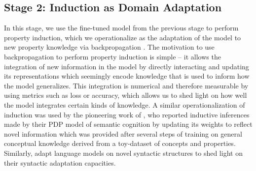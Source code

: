 \documentclass[10pt,letterpaper]{article}
\begin{document}
\subsection{Stage 2: Induction as Domain Adaptation}
In this stage, we use the fine-tuned model from the previous stage to perform property induction, which we operationalize as the adaptation of the model to new property knowledge via backpropagation \citep{rumelhart1986learning}.
The motivation to use backpropagation to perform property induction is simple -- it allows the integration of new information in the model by directly interacting and updating its representations which seemingly encode knowledge that is used to inform how the model generalizes. 
This integration is numerical and therefore measurable by using metrics such as loss or accuracy, which allows us to shed light on how well the model integrates certain kinds of knowledge.
A similar operationalization of induction was used by the pioneering work of \citet{rogers2004semantic}, who reported inductive inferences made by their PDP model of semantic cognition by updating its weights to reflect novel information which was provided after several steps of training on general conceptual knowledge derived from a toy-dataset of concepts and properties.
Similarly, \citet{van2018neural} adapt language models on novel syntactic structures to shed light on their syntactic adaptation capacities.
\end{document}
